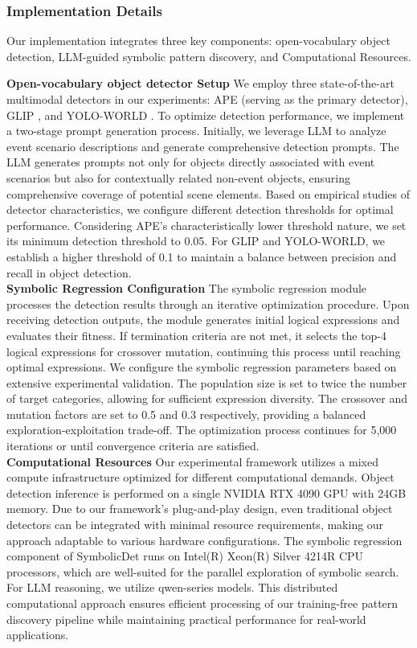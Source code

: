 \subsubsection{Implementation Details}
Our implementation integrates three key components: open-vocabulary object detection, LLM-guided symbolic pattern discovery, and Computational Resources. \par
% 
\noindent
\textbf{Open-vocabulary object detector Setup}
We employ three state-of-the-art multimodal detectors in our experiments: APE \cite{shen2024aligning} (serving as the primary detector), GLIP \cite{li2022grounded}, and YOLO-WORLD \cite{cheng2024yolo}. To optimize detection performance, we implement a two-stage prompt generation process. Initially, we leverage LLM to analyze event scenario descriptions and generate comprehensive detection prompts. The LLM generates prompts not only for objects directly associated with event scenarios but also for contextually related non-event objects, ensuring comprehensive coverage of potential scene elements. Based on empirical studies of detector characteristics, we configure different detection thresholds for optimal performance. Considering APE's characteristically lower threshold nature, we set its minimum detection threshold to 0.05. For GLIP and YOLO-WORLD, we establish a higher threshold of 0.1 to maintain a balance between precision and recall in object detection.  \\
\noindent
\textbf{Symbolic Regression Configuration}
The symbolic regression module processes the detection results through an iterative optimization procedure. Upon receiving detection outputs, the module generates initial logical expressions and evaluates their fitness. If termination criteria are not met, it selects the top-4 logical expressions for crossover mutation, continuing this process until reaching optimal expressions.
We configure the symbolic regression parameters based on extensive experimental validation. The population size is set to twice the number of target categories, allowing for sufficient expression diversity. The crossover and mutation factors are set to 0.5 and 0.3 respectively, providing a balanced exploration-exploitation trade-off. The optimization process continues for 5,000 iterations or until convergence criteria are satisfied. \\
\noindent
\textbf{Computational Resources}
Our experimental framework utilizes a mixed compute infrastructure optimized for different computational demands. Object detection inference is performed on a single NVIDIA RTX 4090 GPU with 24GB memory. Due to our framework's plug-and-play design, even traditional object detectors can be integrated with minimal resource requirements, making our approach adaptable to various hardware configurations. The symbolic regression component of SymbolicDet runs on Intel(R) Xeon(R) Silver 4214R CPU processors, which are well-suited for the parallel exploration of symbolic search. For LLM reasoning, we utilize qwen-series models. This distributed computational approach ensures efficient processing of our training-free pattern discovery pipeline while maintaining practical performance for real-world applications.
% 

